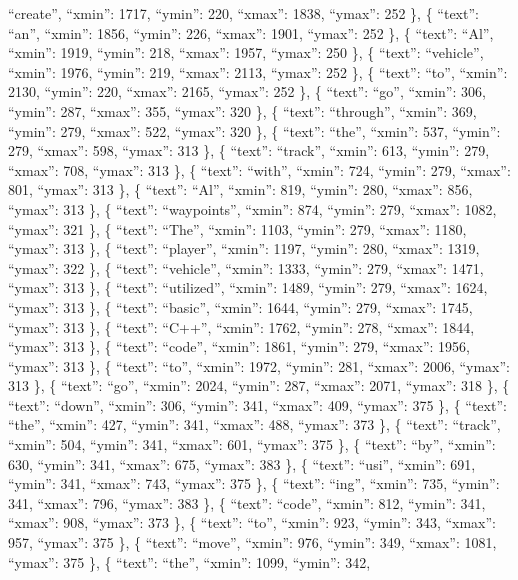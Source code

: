 \documentclass[
]{article}
\begin{document}
``create'', ``xmin'': 1717, ``ymin'': 220, ``xmax'': 1838, ``ymax'': 252
\}, \{ ``text'': ``an'', ``xmin'': 1856, ``ymin'': 226, ``xmax'': 1901,
``ymax'': 252 \}, \{ ``text'': ``Al'', ``xmin'': 1919, ``ymin'': 218,
``xmax'': 1957, ``ymax'': 250 \}, \{ ``text'': ``vehicle'', ``xmin'':
1976, ``ymin'': 219, ``xmax'': 2113, ``ymax'': 252 \}, \{ ``text'':
``to'', ``xmin'': 2130, ``ymin'': 220, ``xmax'': 2165, ``ymax'': 252 \},
\{ ``text'': ``go'', ``xmin'': 306, ``ymin'': 287, ``xmax'': 355,
``ymax'': 320 \}, \{ ``text'': ``through'', ``xmin'': 369, ``ymin'':
279, ``xmax'': 522, ``ymax'': 320 \}, \{ ``text'': ``the'', ``xmin'':
537, ``ymin'': 279, ``xmax'': 598, ``ymax'': 313 \}, \{ ``text'':
``track'', ``xmin'': 613, ``ymin'': 279, ``xmax'': 708, ``ymax'': 313
\}, \{ ``text'': ``with'', ``xmin'': 724, ``ymin'': 279, ``xmax'': 801,
``ymax'': 313 \}, \{ ``text'': ``Al'', ``xmin'': 819, ``ymin'': 280,
``xmax'': 856, ``ymax'': 313 \}, \{ ``text'': ``waypoints'', ``xmin'':
874, ``ymin'': 279, ``xmax'': 1082, ``ymax'': 321 \}, \{ ``text'':
``The'', ``xmin'': 1103, ``ymin'': 279, ``xmax'': 1180, ``ymax'': 313
\}, \{ ``text'': ``player'', ``xmin'': 1197, ``ymin'': 280, ``xmax'':
1319, ``ymax'': 322 \}, \{ ``text'': ``vehicle'', ``xmin'': 1333,
``ymin'': 279, ``xmax'': 1471, ``ymax'': 313 \}, \{ ``text'':
``utilized'', ``xmin'': 1489, ``ymin'': 279, ``xmax'': 1624, ``ymax'':
313 \}, \{ ``text'': ``basic'', ``xmin'': 1644, ``ymin'': 279, ``xmax'':
1745, ``ymax'': 313 \}, \{ ``text'': ``C++'', ``xmin'': 1762, ``ymin'':
278, ``xmax'': 1844, ``ymax'': 313 \}, \{ ``text'': ``code'', ``xmin'':
1861, ``ymin'': 279, ``xmax'': 1956, ``ymax'': 313 \}, \{ ``text'':
``to'', ``xmin'': 1972, ``ymin'': 281, ``xmax'': 2006, ``ymax'': 313 \},
\{ ``text'': ``go'', ``xmin'': 2024, ``ymin'': 287, ``xmax'': 2071,
``ymax'': 318 \}, \{ ``text'': ``down'', ``xmin'': 306, ``ymin'': 341,
``xmax'': 409, ``ymax'': 375 \}, \{ ``text'': ``the'', ``xmin'': 427,
``ymin'': 341, ``xmax'': 488, ``ymax'': 373 \}, \{ ``text'': ``track'',
``xmin'': 504, ``ymin'': 341, ``xmax'': 601, ``ymax'': 375 \}, \{
``text'': ``by'', ``xmin'': 630, ``ymin'': 341, ``xmax'': 675, ``ymax'':
383 \}, \{ ``text'': ``usi'', ``xmin'': 691, ``ymin'': 341, ``xmax'':
743, ``ymax'': 375 \}, \{ ``text'': ``ing'', ``xmin'': 735, ``ymin'':
341, ``xmax'': 796, ``ymax'': 383 \}, \{ ``text'': ``code'', ``xmin'':
812, ``ymin'': 341, ``xmax'': 908, ``ymax'': 373 \}, \{ ``text'':
``to'', ``xmin'': 923, ``ymin'': 343, ``xmax'': 957, ``ymax'': 375 \},
\{ ``text'': ``move'', ``xmin'': 976, ``ymin'': 349, ``xmax'': 1081,
``ymax'': 375 \}, \{ ``text'': ``the'', ``xmin'': 1099, ``ymin'': 342,
\end{document}

